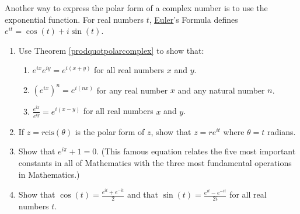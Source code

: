 \documentclass{ximera}
\begin{document}
\begin{problem} \label{eulerformulaexercise} 
Another way to express the polar form of a complex number is to use the exponential function.  For real numbers $t$, \href{http://en.wikipedia.org/wiki/Leonhard_Euler}{\underline{Euler}}'s Formula defines $e^{it} = \cos(t) + i \sin(t)$.  

\begin{enumerate}

\item Use Theorem \ref{prodquotpolarcomplex} to show that:

\begin{enumerate}

\item  $e^{ix} e^{iy} = e^{i(x+y)}$ for all real numbers $x$ and $y$.

\item  $\left(e^{ix}\right)^{n} = e^{i(nx)}$ for any real number $x$ and any natural number $n$.

\item $\frac{e^{ix}}{e^{iy}} = e^{i(x-y)}$ for all real numbers $x$ and $y$.

\end{enumerate}



\item If $z = r\text{cis}(\theta)$ is the polar form of $z$, show that $z = re^{it}$ where $\theta = t$ radians.

\item Show that $e^{i\pi} + 1 = 0$.  (This famous equation relates the five most important constants in all of Mathematics with the three most fundamental operations in Mathematics.)

\item  \label{expformcosandsin} Show that $\cos(t) = \frac{e^{it} + e^{-it}}{2}$ and that $\sin(t) = \frac{e^{it} - e^{-it}}{2i}$ for all real numbers $t$. 

\end{enumerate}

\end{problem}
\end{document}
